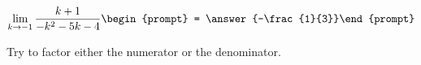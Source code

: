 \documentclass{ximera}
\author{Bart Snapp}
\begin{document}
\begin{exercise}

\[
\lim_{k\to -1 } \frac{k+1}{-k^2-5 k-4}\begin{prompt} = \answer{-\frac{1}{3}}\end{prompt}
\]
\begin{hint}
Try to factor either the numerator or the denominator.
\end{hint}
\end{exercise}
\end{document}
